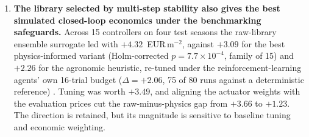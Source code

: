 \begin{enumerate}
\item \textbf{The library selected by multi-step stability also gives the best
simulated closed-loop economics under the benchmarking safeguards.} Across
15 controllers on four test seasons the raw-library ensemble surrogate
\cite{fasel2022} led with $+4.32$~EUR\,m$^{-2}$, against $+3.09$ for the best
physics-informed variant (Holm-corrected $p=7.7\times10^{-4}$, family of 15) and
$+2.26$ for the agronomic heuristic, re-tuned under the reinforcement-learning
agents' own 16-trial budget ($\Delta=+2.06$, 75 of 80 runs against a
deterministic reference) \cite{wilcoxon1945,holm1979}. Tuning was worth $+3.49$,
and aligning the actuator weights with the evaluation prices cut the raw-minus-physics
gap from $+3.66$ to $+1.23$. The direction is retained, but its magnitude is sensitive
to baseline tuning and economic weighting.


\end{enumerate}
